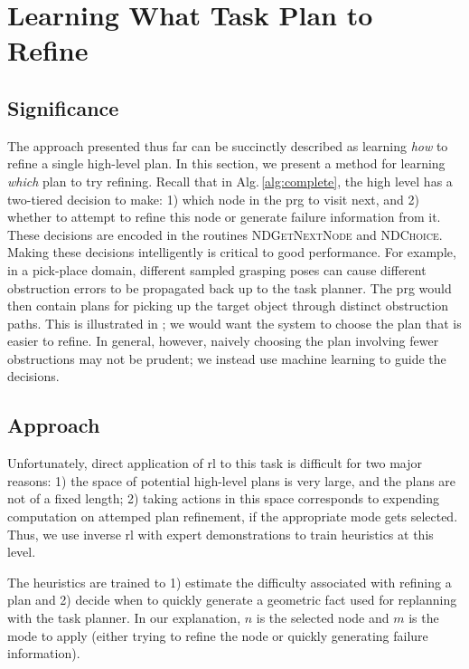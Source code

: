 \section{Learning What Task Plan to Refine}
\subsection{Significance}
The approach presented thus far can be succinctly described as learning \emph{how} to
refine a single high-level plan. In this section, we present a method for learning
\emph{which} plan to try refining. Recall that in Alg.\,\ref{alg:complete}, the high
level has a two-tiered decision to make: 1) which node in the {\sc prg} to
visit next, and 2) whether to attempt to refine this node or generate failure information
from it. These decisions are encoded in the routines \textsc{NDGetNextNode}
and \textsc{NDChoice}. Making these decisions intelligently is critical to good
performance. For example, in a pick-place domain, different sampled grasping poses
can cause different obstruction errors to be propagated back up to the task planner. The {\sc prg}
would then contain plans for picking up the target object through distinct obstruction paths. This
is illustrated in ; we would want the system to choose the plan that is easier
to refine. In general, however, naively choosing the plan involving fewer obstructions
may not be prudent; we instead use machine learning to guide the decisions.

\subsection{Approach}
Unfortunately, direct application of {\sc rl} to this task is difficult for two major reasons: 1)
the space of potential high-level plans is very large, and the plans are not of a fixed length; 2)
taking actions in this space corresponds to expending computation on attemped plan refinement, if the
appropriate mode gets selected. Thus, we use inverse {\sc rl} with expert demonstrations to train heuristics at this level.

The heuristics are trained to 1) estimate the difficulty associated with refining a plan and 2) decide when to quickly generate
a geometric fact used for replanning with the task planner. In our explanation, $n$ is the selected
node and $m$ is the mode to apply (either trying to refine the node or quickly generating failure information).

